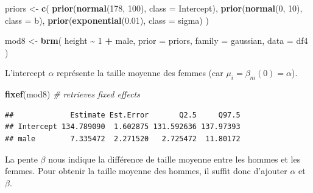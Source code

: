 \documentclass[
  a4paper,11pt,twoside,onecolumn,openright,final,oldfontcommands]{memoir}
\newenvironment{Shaded}{\begin{snugshade}}{\end{snugshade}}
\newcommand{\CommentTok}[1]{\textcolor[rgb]{0.56,0.35,0.01}{\textit{#1}}}
\newcommand{\DataTypeTok}[1]{\textcolor[rgb]{0.13,0.29,0.53}{#1}}
\newcommand{\DecValTok}[1]{\textcolor[rgb]{0.00,0.00,0.81}{#1}}
\newcommand{\FloatTok}[1]{\textcolor[rgb]{0.00,0.00,0.81}{#1}}
\newcommand{\KeywordTok}[1]{\textcolor[rgb]{0.13,0.29,0.53}{\textbf{#1}}}
\newcommand{\NormalTok}[1]{#1}
\newcommand{\OperatorTok}[1]{\textcolor[rgb]{0.81,0.36,0.00}{\textbf{#1}}}
\newcommand{\StringTok}[1]{\textcolor[rgb]{0.31,0.60,0.02}{#1}}
\theoremstyle{definition}
\theoremstyle{definition}
\theoremstyle{definition}
\theoremstyle{remark}
\begin{document}
\begin{Shaded}
\begin{Highlighting}[]
\NormalTok{priors \textless{}{-}}\StringTok{ }\KeywordTok{c}\NormalTok{(}
  \KeywordTok{prior}\NormalTok{(}\KeywordTok{normal}\NormalTok{(}\DecValTok{178}\NormalTok{, }\DecValTok{100}\NormalTok{), }\DataTypeTok{class =}\NormalTok{ Intercept),}
  \KeywordTok{prior}\NormalTok{(}\KeywordTok{normal}\NormalTok{(}\DecValTok{0}\NormalTok{, }\DecValTok{10}\NormalTok{), }\DataTypeTok{class =}\NormalTok{ b),}
  \KeywordTok{prior}\NormalTok{(}\KeywordTok{exponential}\NormalTok{(}\FloatTok{0.01}\NormalTok{), }\DataTypeTok{class =}\NormalTok{ sigma)}
\NormalTok{  )}

\NormalTok{mod8 \textless{}{-}}\StringTok{ }\KeywordTok{brm}\NormalTok{(}
\NormalTok{  height }\OperatorTok{\textasciitilde{}}\StringTok{ }\DecValTok{1} \OperatorTok{+}\StringTok{ }\NormalTok{male,}
  \DataTypeTok{prior =}\NormalTok{ priors,}
  \DataTypeTok{family =}\NormalTok{ gaussian,}
  \DataTypeTok{data =}\NormalTok{ df4}
\NormalTok{  )}
\end{Highlighting}
\end{Shaded}

L'intercept \(\alpha\) représente la taille moyenne des femmes (car \(\mu_{i} = \beta_{m}(0) = \alpha\)).

\begin{Shaded}
\begin{Highlighting}[]
\KeywordTok{fixef}\NormalTok{(mod8) }\CommentTok{\# retrieves fixed effects}
\end{Highlighting}
\end{Shaded}

\begin{verbatim}
##             Estimate Est.Error       Q2.5     Q97.5
## Intercept 134.789090  1.602875 131.592636 137.97393
## male        7.335472  2.271520   2.725472  11.80172
\end{verbatim}

La pente \(\beta\) nous indique la différence de taille moyenne entre les hommes et les femmes. Pour obtenir la taille moyenne des hommes, il suffit donc d'ajouter \(\alpha\) et \(\beta\).

\begin{Shaded}
\end{Shaded}
\end{document}
